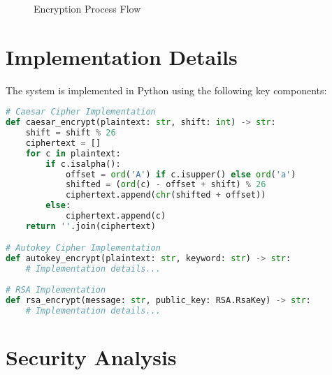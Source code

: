 \documentclass[12pt,a4paper]{article}
\begin{document}
\begin{figure}[H]
\centering
{}
\caption{Encryption Process Flow}
\end{figure}

\section{Implementation Details}
The system is implemented in Python using the following key components:

\begin{lstlisting}[language=Python, caption=Key Implementation Components]
# Caesar Cipher Implementation
def caesar_encrypt(plaintext: str, shift: int) -> str:
    shift = shift % 26
    ciphertext = []
    for c in plaintext:
        if c.isalpha():
            offset = ord('A') if c.isupper() else ord('a')
            shifted = (ord(c) - offset + shift) % 26
            ciphertext.append(chr(shifted + offset))
        else:
            ciphertext.append(c)
    return ''.join(ciphertext)

# Autokey Cipher Implementation
def autokey_encrypt(plaintext: str, keyword: str) -> str:
    # Implementation details...
    
# RSA Implementation
def rsa_encrypt(message: str, public_key: RSA.RsaKey) -> str:
    # Implementation details...
\end{lstlisting}

\section{Security Analysis}
\end{document}
